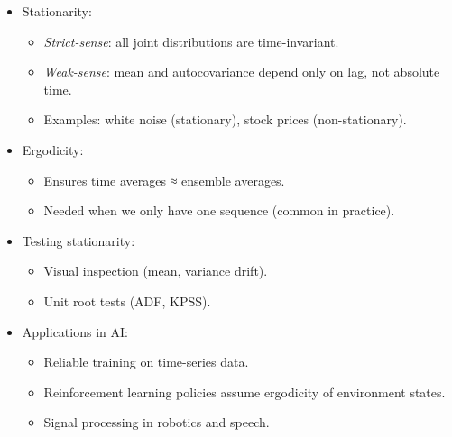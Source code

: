 \documentclass[
  letterpaper,
  DIV=11,
  numbers=noendperiod]{scrreprt}
\providecommand{\tightlist}{%
  \setlength{\itemsep}{0pt}\setlength{\parskip}{0pt}}
\begin{document}
\begin{itemize}
\item
  Stationarity:

  \begin{itemize}
  \tightlist
  \item
    \emph{Strict-sense}: all joint distributions are time-invariant.
  \item
    \emph{Weak-sense}: mean and autocovariance depend only on lag, not
    absolute time.
  \item
    Examples: white noise (stationary), stock prices (non-stationary).
  \end{itemize}
\item
  Ergodicity:

  \begin{itemize}
  \tightlist
  \item
    Ensures time averages ≈ ensemble averages.
  \item
    Needed when we only have one sequence (common in practice).
  \end{itemize}
\item
  Testing stationarity:

  \begin{itemize}
  \tightlist
  \item
    Visual inspection (mean, variance drift).
  \item
    Unit root tests (ADF, KPSS).
  \end{itemize}
\item
  Applications in AI:

  \begin{itemize}
  \tightlist
  \item
    Reliable training on time-series data.
  \item
    Reinforcement learning policies assume ergodicity of environment
    states.
  \item
    Signal processing in robotics and speech.
  \end{itemize}
\end{itemize}
\end{document}
